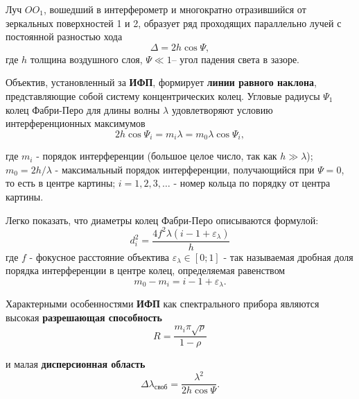 Луч $OO_1$, вошедший в интерферометр и многократно отразившийся от зеркальных поверхностей 1 и 2, образует ряд проходящих параллельно лучей с постоянной разностью хода 
\begin{equation}
	\Delta=2h \cos \Psi,
\end{equation} где $h$ толщина воздушного слоя, $\Psi\ll 1$-- угол падения света в зазоре. 

Объектив, установленный за \textbf{ИФП}, формирует \textbf{линии равного наклона}, представляющие собой систему концентрических колец. Угловые радиусы $\Psi_1$ колец Фабри-Перо для длины волны $\lambda$ удовлетворяют условию интерференционных максимумов 
\begin{equation}
\label{eq:24}
	2h \cos \Psi_i = m_i \lambda=m_0 \lambda \cos \Psi_i,
\end{equation}

где $m_i$ - порядок интерференции (большое целое число, так как $h \gg \lambda$); $m_0=2h/\lambda$ - максимальный порядок интерференции, получающийся при $\Psi=0$, то есть в центре картины; $i=1, 2, 3,\dots$ - номер кольца по порядку от центра картины. 



Легко показать, что диаметры колец Фабри-Перо описываются формулой: 
\begin{equation}
	d_i^2=\frac{4 f^2 \lambda (i-1+\varepsilon_{\lambda})}{h}
\end{equation}
где $f$ - фокусное расстояние объектива $\varepsilon_{\lambda} \in [0;1]$ - так называемая дробная доля порядка интерференции в центре колец, определяемая равенством 
\begin{equation}
	m_0 - m_i=i-1+\varepsilon_{\lambda}.
\end{equation}

 Характерными особенностями \textbf{ИФП} как спектрального прибора являются высокая \textbf{разрешающая способность}
 \begin{equation}
 	R=\frac{m_i \pi \sqrt{\rho}}{1-\rho}
 \end{equation}
 
и малая \textbf{дисперсионная область}
\begin{equation}
 	\Delta \lambda_{\text{своб}}=\frac{\lambda^2}{2h \cos \Psi}.
 \end{equation} 

